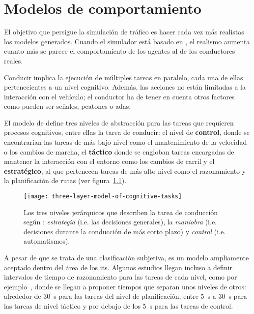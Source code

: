 \chapter{Modelos de comportamiento}
\label{ch:sota-behavior-models}

El objetivo que persigue la simulación de tráfico es hacer cada vez más realistas los modelos generados. Cuando el simulador está basado en , el realismo aumenta cuanto más se parece el comportamiento de los agentes al de los conductores reales.

Conducir implica la ejecución de múltiples tareas en paralelo, cada una de ellas pertenecientes a un nivel cognitivo. Además, las acciones no están limitadas a la interacción con el vehículo; el conductor ha de tener en cuenta otros factores como pueden ser señales, peatones o \gls{adas}.

El modelo de \cite{michon1985critical} define tres niveles de abstracción para las tareas que requieren procesos cognitivos, entre ellas la tarea de conducir: el nivel de \textbf{control}, donde se encontrarían las tareas de más bajo nivel como el mantenimiento de la velocidad o los cambios de marcha, el \textbf{táctico} donde se engloban tareas encargadas de mantener la interacción con el entorno como los cambios de carril y el \textbf{estratégico}, al que pertenecen tareas de más alto nivel como el razonamiento y la planificación de rutas (ver figura~\ref{fig:three-levels-of-human-driving}).

\begin{figure}
	\centering
	\texttt{[image: three-layer-model-of-cognitive-tasks]}
	\caption[Los tres niveles jerárquicos de la conducción]{Los tres niveles jerárquicos que describen la tarea de conducción según \cite{michon1985critical}: \textit{estrategia} (i.e. las decisiones generales), la \textit{maniobra} (i.e. decisiones durante la conducción de más corto plazo) y \textit{control} (i.e. automatismos).}
	\label{fig:three-levels-of-human-driving}
\end{figure}

A pesar de que se trata de una clasificación subjetiva, es un modelo ampliamente aceptado dentro del área de los \acrshort{its}. Algunos estudios llegan incluso a definir intervalos de tiempo de razonamiento para las tareas de cada nivel, como por ejemplo~\cite{Alexiadis2004}, donde se llegan a proponer tiempos que separan unos niveles de otros: alrededor de \SI{30}{\second} para las tareas del nivel de planificación, entre \SI{5}{\second} a \SI{30}{\second} para las tareas de nivel táctico y por debajo de los \SI{5}{\second} para las tareas de control.

